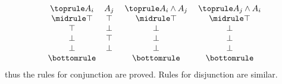 \begin{myproof}
    \[
        \begin{array}{c c} \toprule
            A_i & A_j \\ \midrule
            \top & \top \\
            \top & \bot \\
            \bot & \top \\
            \bot & \bot \\ \bottomrule
        \end{array}
        \;
        \begin{array}{c}\toprule
            A_i\wedge A_j \\ \midrule
            \top \\
            \bot \\
            \bot \\
            \bot \\ \bottomrule
        \end{array}
        \;
        \begin{array}{c}\toprule
            A_j\wedge A_i \\ \midrule
            \top \\
            \bot \\
            \bot \\
            \bot \\ \bottomrule
        \end{array}
    \]
    thus the rules for conjunction are proved.
    Rules for disjunction are similar.
\end{myproof}